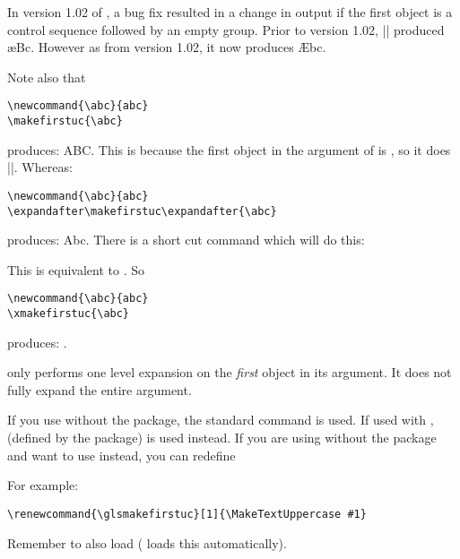 \documentclass{nlctdoc}
\begin{document}
\begin{important}
In version 1.02 of , a bug fix resulted in a change
in output if the first object is a control sequence followed by
an empty group. Prior to version 1.02, ||
produced \ae Bc. However as from version 1.02, it now produces
\AE bc.
\end{important}

Note also that
\begin{verbatim}
\newcommand{\abc}{abc}
\makefirstuc{\abc}
\end{verbatim}
produces: ABC. This is because the first object in the argument of
 is , so it does |\MakeUppercase{\abc}|.
Whereas:
\begin{verbatim}
\newcommand{\abc}{abc}
\expandafter\makefirstuc\expandafter{\abc}
\end{verbatim}
produces: Abc. There is a short cut command which will do this:
\begin{definition}[\DescribeMacro{\xmakefirstuc}]
\end{definition}
This is equivalent to . So
\begin{verbatim}
\newcommand{\abc}{abc}
\xmakefirstuc{\abc}
\end{verbatim}
produces: 
\newcommand{\abc}{abc}%
\xmakefirstuc{\abc}.

\begin{important}
 only performs one level expansion on the
\emph{first} object in its argument. It does not fully expand the entire
argument.
\end{important}

If you use  without the  package, 
the standard  command is used. If used with
,  (defined by 
the package) is used instead. If you are using 
without the  package and want to use
 instead, you can redefine
\begin{definition}[\DescribeMacro\glsmakefirstuc]
\end{definition}
For example:
\begin{verbatim}
\renewcommand{\glsmakefirstuc}[1]{\MakeTextUppercase #1}
\end{verbatim}
Remember to also load  ( loads this
automatically).
\end{document}

